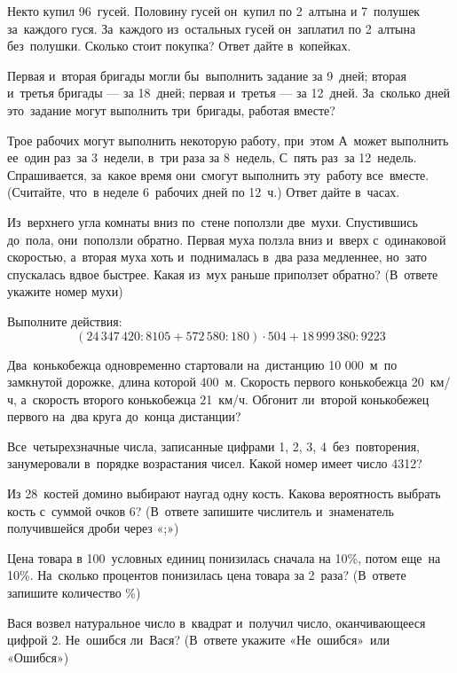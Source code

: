Некто купил 96~гусей. Половину гусей он~купил по 2~алтына и 7~полушек за~каждого гуся. За~каждого из~остальных 
гусей он~заплатил по 2~алтына без~полушки. Сколько стоит покупка? Ответ дайте в~копейках.

Первая и~вторая бригады могли бы~выполнить задание за 9~дней; вторая и~третья бригады — за 18~дней; 
первая и~третья — за 12~дней. За~сколько дней это~задание могут выполнить три~бригады, работая вместе?

Трое рабочих могут выполнить некоторую работу, при~этом А~может выполнить ее~один раз~за 3~недели, 
в~три раза за 8~недель, С~пять раз~за 12~недель. Спрашивается, за~какое время они~смогут выполнить эту~работу 
все~вместе. (Считайте, что~в неделе 6~рабочих дней по 12~ч.) Ответ дайте в~часах.

Из~верхнего угла комнаты вниз по~стене поползли две~мухи. Спустившись до~пола, они~поползли обратно. 
Первая муха ползла вниз и~вверх с~одинаковой скоростью, а~вторая муха хоть и~поднималась в~два раза медленнее, 
но~зато спускалась вдвое быстрее. Какая из~мух раньше приползет обратно? (В~ответе укажите номер мухи)

Выполните действия:
$$(24\,347\,420 : 8105 + 572\,580 : 180)\cdot 504 + 18\,999\,380:9223$$

Два~конькобежца одновременно стартовали на~дистанцию 10 000~м~по замкнутой дорожке, длина которой 400~м. 
Скорость первого конькобежца 20~км/ч, а~скорость второго конькобежца 21~км/ч. 
Обгонит ли~второй конькобежец первого на~два круга до~конца дистанции?

Все~четырехзначные числа, записанные цифрами 1, 2, 3, 4~без~повторения, занумеровали в~порядке возрастания чисел. 
Какой номер имеет число 4312?

Из 28~костей домино выбирают наугад одну кость. Какова вероятность выбрать кость с~суммой очков 6? 
(В~ответе запишите числитель и~знаменатель получившейся дроби через «;»)

Цена товара в 100~условных единиц понизилась сначала на 10\%, потом еще~на 10\%. 
На~сколько процентов понизилась цена товара за 2~раза? (В~ответе запишите количество \%)

Вася возвел натуральное число в~квадрат и~получил число, оканчивающееся цифрой 2. Не~ошибся ли~Вася? 
(В~ответе укажите «Не~ошибся»~или «Ошибся»)

